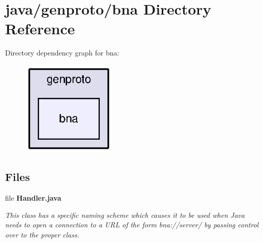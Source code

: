 \section{java/genproto/bna Directory Reference}
\label{dir_9ab14bd24c83483f76923c4d364197b5}
Directory dependency graph for bna\+:\nopagebreak
\begin{figure}[H]
\begin{center}
\leavevmode
\includegraphics[width=130pt]{dir_9ab14bd24c83483f76923c4d364197b5_dep}
\end{center}
\end{figure}
\subsection*{Files}
\begin{DoxyCompactItemize}
\item 
file {\bf Handler.\+java}
\begin{DoxyCompactList}\small\item\em This class has a specific naming scheme which causes it to be used when Java needs to open a connection to a U\+R\+L of the form bna\+://server/ by passing control over to the proper class. \end{DoxyCompactList}\end{DoxyCompactItemize}
